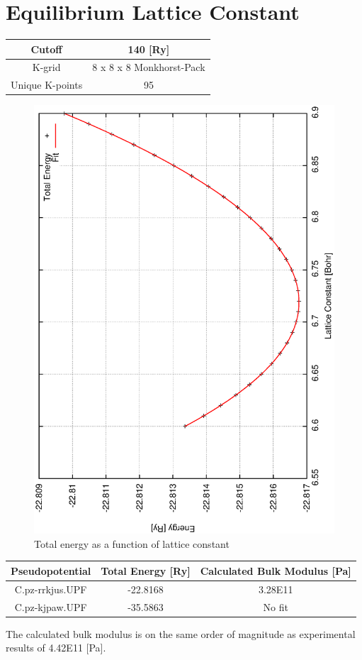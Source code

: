 \documentclass{article}
\begin{document}
\section*{Equilibrium Lattice Constant}
\begin{center}
\begin{tabular}{|c|c|}
  \hline
  Cutoff & 140 [Ry] \\ \hline
  K-grid & 8 x 8 x 8 Monkhorst-Pack  \\ \hline
  Unique K-points & 95 \\ \hline
\end{tabular}
\end{center}
\begin{figure}[h!]
\centering
\includegraphics[totalheight=0.5\textheight, angle=-90]{bulk}
\caption{Total energy as a function of lattice constant}
\label{fig:aNicePicture}
\end{figure}
\begin{center}
\begin{tabular}{|c|c|c|}
  \hline
  Pseudopotential & Total Energy [Ry] & Calculated Bulk Modulus [Pa] \\ \hline
  C.pz-rrkjus.UPF & -22.8168   &   3.28E11  \\ \hline
  C.pz-kjpaw.UPF  & -35.5863   &   No fit \\ \hline
\end{tabular}
\end{center}
The calculated bulk modulus is on the same order of magnitude as experimental results of 4.42E11 [Pa].
\newpage
\end{document}
